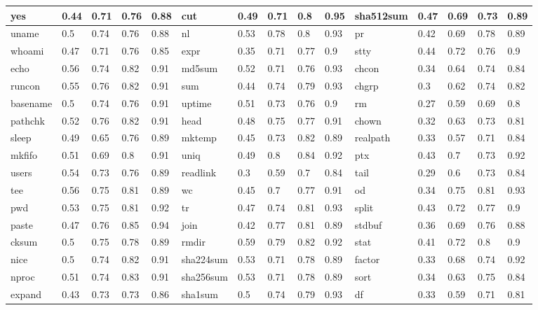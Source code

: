 \begin{table*}[h!]
\begin{center}
\begin{tabular}{ | l | l | l | l | l || l | l | l | l | l || l | l | l | l | l | }
	yes & 0.44 & 0.71 & 0.76 & 0.88 & cut & 0.49 & 0.71 & 0.8 & 0.95 & sha512sum & 0.47 & 0.69 & 0.73 & 0.89 \\ \hline
	uname & 0.5 & 0.74 & 0.76 & 0.88 & nl & 0.53 & 0.78 & 0.8 & 0.93 & pr & 0.42 & 0.69 & 0.78 & 0.89 \\ \hline
	whoami & 0.47 & 0.71 & 0.76 & 0.85 & expr & 0.35 & 0.71 & 0.77 & 0.9 & stty & 0.44 & 0.72 & 0.76 & 0.9 \\ \hline
	echo & 0.56 & 0.74 & 0.82 & 0.91 & md5sum & 0.52 & 0.71 & 0.76 & 0.93 & chcon & 0.34 & 0.64 & 0.74 & 0.84 \\ \hline
	runcon & 0.55 & 0.76 & 0.82 & 0.91 & sum & 0.44 & 0.74 & 0.79 & 0.93 & chgrp & 0.3 & 0.62 & 0.74 & 0.82 \\ \hline
	basename & 0.5 & 0.74 & 0.76 & 0.91 & uptime & 0.51 & 0.73 & 0.76 & 0.9 & rm & 0.27 & 0.59 & 0.69 & 0.8 \\ \hline
	pathchk & 0.52 & 0.76 & 0.82 & 0.91 & head & 0.48 & 0.75 & 0.77 & 0.91 & chown & 0.32 & 0.63 & 0.73 & 0.81 \\ \hline
	sleep & 0.49 & 0.65 & 0.76 & 0.89 & mktemp & 0.45 & 0.73 & 0.82 & 0.89 & realpath & 0.33 & 0.57 & 0.71 & 0.84 \\ \hline
	mkfifo & 0.51 & 0.69 & 0.8 & 0.91 & uniq & 0.49 & 0.8 & 0.84 & 0.92 & ptx & 0.43 & 0.7 & 0.73 & 0.92 \\ \hline
	users & 0.54 & 0.73 & 0.76 & 0.89 & readlink & 0.3 & 0.59 & 0.7 & 0.84 & tail & 0.29 & 0.6 & 0.73 & 0.84 \\ \hline
	tee & 0.56 & 0.75 & 0.81 & 0.89 & wc & 0.45 & 0.7 & 0.77 & 0.91 & od & 0.34 & 0.75 & 0.81 & 0.93 \\ \hline
	pwd & 0.53 & 0.75 & 0.81 & 0.92 & tr & 0.47 & 0.74 & 0.81 & 0.93 & split & 0.43 & 0.72 & 0.77 & 0.9 \\ \hline
	paste & 0.47 & 0.76 & 0.85 & 0.94 & join & 0.42 & 0.77 & 0.81 & 0.89 & stdbuf & 0.36 & 0.69 & 0.76 & 0.88 \\ \hline
	cksum & 0.5 & 0.75 & 0.78 & 0.89 & rmdir & 0.59 & 0.79 & 0.82 & 0.92 & stat & 0.41 & 0.72 & 0.8 & 0.9 \\ \hline
	nice & 0.5 & 0.74 & 0.82 & 0.91 & sha224sum & 0.53 & 0.71 & 0.78 & 0.89 & factor & 0.33 & 0.68 & 0.74 & 0.92 \\ \hline
	nproc & 0.51 & 0.74 & 0.83 & 0.91 & sha256sum & 0.53 & 0.71 & 0.78 & 0.89 & sort & 0.34 & 0.63 & 0.75 & 0.84 \\ \hline
	expand & 0.43 & 0.73 & 0.73 & 0.86 & sha1sum & 0.5 & 0.74 & 0.79 & 0.93 & df & 0.33 & 0.59 & 0.71 & 0.81 \\ \hline

\end{tabular}
\end{center}
\end{table*}
